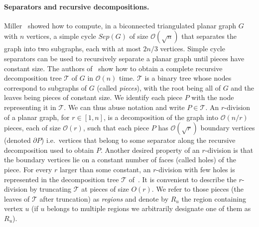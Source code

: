 \documentclass[11pt]{article}
\theoremstyle{plain}
\newcommand{\cO}{\mathcal{O}}
\newcommand{\TG}{\mathcal{T}}
\begin{document}
\paragraph{Separators and recursive decompositions.}
Miller~\cite{DBLP:conf/stoc/Miller84} showed how to compute, in a biconnected triangulated planar graph $G$ with $n$ vertices, a simple cycle $Sep(G)$ of size $\cO(\sqrt{n})$ that separates the graph into two subgraphs, each with at most $2n/3$ vertices. Simple cycle separators can be used to recursively separate a planar graph until pieces have constant size.
The authors of~\cite{DBLP:conf/stoc/KleinMS13} show how to obtain a complete recursive decomposition tree $\TG$ of $G$ in $\cO(n)$ time. 
$\TG$ is a binary tree whose nodes correspond to subgraphs of $G$ (called {\em pieces}), with the root being all of $G$ and the leaves being pieces of constant size.
We identify each piece $P$ with the node representing it in $\TG$. We can thus abuse notation and write $P\in \TG$.
An $r$-division~\cite{DBLP:journals/siamcomp/Frederickson87} of a planar graph, for $r \in [1,n]$, is a decomposition of the graph into $\cO(n/r)$ pieces, each of size $\cO(r)$, such that each piece $P$ has $\cO(\sqrt{r})$ boundary vertices (denoted  $\partial P$) i.e.~vertices that belong to some separator along the recursive decomposition used to obtain $P$.
Another desired property of an $r$-division is that the boundary vertices lie on a constant number of faces  (called holes) of the piece.
For every $r$ larger than some constant, an $r$-division with few holes is represented in the decomposition tree $\TG$ of~\cite{DBLP:conf/stoc/KleinMS13}. It is convenient to describe the $r$-division by truncating $\TG$ at pieces of size $O(r)$. We refer to those pieces (the leaves of $\TG$ after truncation) as {\em regions} and denote by $R_u$ the region containing vertex $u$ (if $u$ belongs to multiple regions we arbitrarily designate one of them as $R_u$).
 
%
\end{document}
